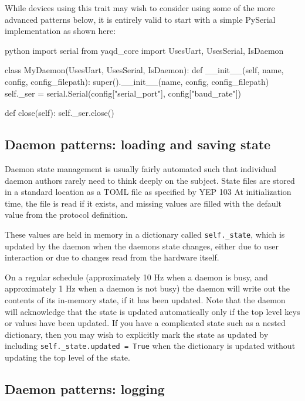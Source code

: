 While devices using this trait may wish to consider using some of the more advanced patterns below, it is entirely valid to start with a simple PySerial\cite{pyserial} implementation as shown here:

\begin{codefragment}{python}
import serial
from yaqd_core import UsesUart, UsesSerial, IsDaemon

class MyDaemon(UsesUart, UsesSerial, IsDaemon):
    def __init__(self, name, config, config_filepath):
        super().__init__(name, config, config_filepath)
        self._ser = serial.Serial(config["serial_port"], config["baud_rate"])

    def close(self):
        self._ser.close()
\end{codefragment}


\subsection{Daemon patterns: loading and saving state}

Daemon state management is usually fairly automated such that individual daemon authors rarely need to think deeply on the subject.
State files are stored in a standard location as a TOML file as specified by YEP 103\cite{yep103}
At initialization time, the file is read if it exists, and missing values are filled with the default value from the protocol definition.

These values are held in memory in a dictionary called \texttt{self.\_state}, which is updated by the daemon when the daemons state changes, either due to user interaction or due to changes read from the hardware itself.

On a regular schedule (approximately 10 Hz when a daemon is busy, and approximately 1 Hz when a daemon is not busy) the daemon will write out the contents of its in-memory state, if it has been updated.
Note that the daemon will acknowledge that the state is updated automatically only if the top level keys or values have been updated.
If you have a complicated state such as a nested dictionary, then you may wish to explicitly mark the state as updated by including \texttt{self.\_state.updated = True} when the dictionary is updated without updating the top level of the state.

\subsection{Daemon patterns: logging}

